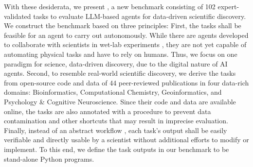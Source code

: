 %
With these desiderata, we present \bench, a new benchmark consisting of 102 expert-validated tasks to evaluate LLM-based agents for data-driven scientific discovery. 
We construct the benchmark based on three principles:
First,  the tasks shall be feasible for an agent to carry out autonomously.
While there are agents developed to collaborate with scientists in wet-lab experiments \citep{coscientist,doi:10.1021/acscentsci.3c01087}, they are not yet capable of automating physical tasks and have to rely on humans. 
Thus, we focus on one paradigm for science, data-driven discovery, due to the digital nature of AI agents.
Second, to resemble real-world scientific discovery,  we derive the tasks from open-source code and data of 44 peer-reviewed publications in four data-rich domains: Bioinformatics, Computational Chemistry, Geoinformatics, and Psychology \& Cognitive Neuroscience.
Since their code and data are available online, the tasks are also annotated with a procedure to prevent data contamination and other shortcuts \citep{kapoor2024aiagentsmatter} that may result in imprecise evaluation.
Finally, instead of an abstract workflow \citep{majumder2024discoverybenchdatadrivendiscoverylarge}, each task's output shall be easily verifiable and directly usable by a scientist without additional efforts to modify or implement. 
To this end, we define the task outputs in our benchmark to be stand-alone Python programs. 
%